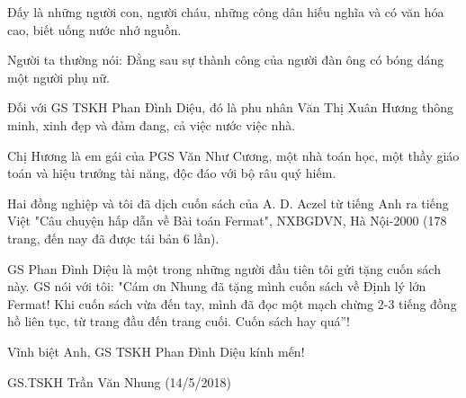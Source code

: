Đấy là những người con, người cháu, những công dân hiếu nghĩa và có văn hóa cao, biết uống nước nhớ nguồn.

Người ta thường nói: Đằng sau sự thành công của người đàn ông có bóng dáng một người phụ nữ.

Đối với GS TSKH Phan Đình Diệu, đó là phu nhân Văn Thị Xuân Hương thông minh, xinh đẹp và đảm đang, cả việc nước việc nhà.

Chị Hương là em gái của PGS Văn Như Cương, một nhà toán học, một thầy giáo toán và hiệu trưởng tài năng, độc đáo với bộ râu quý hiếm.

Hai đồng nghiệp và tôi đã dịch cuốn sách của A. D. Aczel từ tiếng Anh ra tiếng Việt "Câu chuyện hấp dẫn về Bài toán Fermat", NXBGDVN, Hà Nội-2000 (178 trang, đến nay đã được tái bản 6 lần).

GS Phan Đình Diệu là một trong những người đầu tiên tôi gửi tặng cuốn sách này. GS nói với tôi: "Cám ơn Nhung đã tặng mình cuốn sách về Định lý lớn Fermat! Khi cuốn sách vừa đến tay, mình đã đọc một mạch chừng 2-3 tiếng đồng hồ liên tục, từ trang đầu đến trang cuối. Cuốn sách hay quá”!

Vĩnh biệt Anh, GS TSKH Phan Đình Diệu kính mến!

GS.TSKH Trần Văn Nhung (14/5/2018)